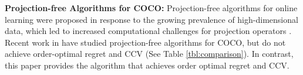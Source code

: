 \noindent \textbf{Projection-free Algorithms for  COCO:} 
Projection-free algorithms for online learning were proposed in response to the growing prevalence of high-dimensional data, which led to increased computational challenges for projection operators \cite{hazan2012projection, hazan2020faster, garber2022new,lee2023projection}. Recent work in  \cite{garber2024projection} have studied  projection-free algorithms for  COCO, but do not achieve order-optimal regret and CCV (See Table \ref{tbl:comparison}). In contrast, this paper provides the algorithm that achieves order optimal regret and CCV.